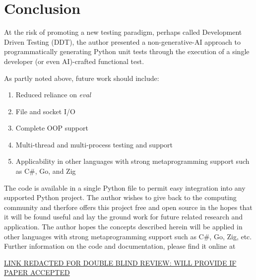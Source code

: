 \section{Conclusion}\label{sec:conclusion}

At the risk of promoting a new testing paradigm, perhaps 
called Development Driven Testing (DDT), the author 
presented a non-generative-AI approach to 
programmatically generating Python unit tests through
the execution of a single developer (or even AI)-crafted
functional test.

As partly noted above, future work should include: 
\begin{enumerate}
  \item Reduced reliance on \textit{eval}
  \item File and socket I/O
  \item Complete OOP support
  \item Multi-thread and multi-process testing and support
  \item Applicability in other languages with strong metaprogramming support such as C\#, Go, and Zig
\end{enumerate}

The code is available in a single Python file to permit 
easy integration into any supported Python project.
The author wishes to give back to the computing community
and therfore offers this project free and open source
in the hopes that it will be found useful and lay the ground
work for future related research and application.
The author hopes the concepts described herein will be 
applied in other languages with strong metaprogramming support
such as C\#, Go, Zig, etc. Further information on the code and  documentation, please
find it online at
%
\begin{center}
  \url{LINK REDACTED FOR DOUBLE BLIND REVIEW: WILL PROVIDE IF PAPER ACCEPTED}
\end{center}


